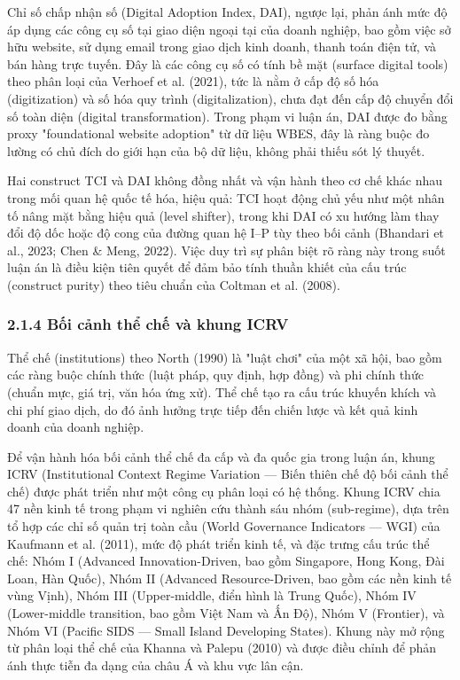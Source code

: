 \documentclass[12pt,a4paper]{article}
\begin{document}
Chỉ số chấp nhận số (Digital Adoption Index, DAI), ngược lại, phản ánh
mức độ áp dụng các công cụ số tại giao diện ngoại tại của doanh nghiệp,
bao gồm việc sở hữu website, sử dụng email trong giao dịch kinh doanh,
thanh toán điện tử, và bán hàng trực tuyến. Đây là các công cụ số có
tính bề mặt (surface digital tools) theo phân loại của Verhoef et al.
(2021), tức là nằm ở cấp độ số hóa (digitization) và số hóa quy trình
(digitalization), chưa đạt đến cấp độ chuyển đổi số toàn diện (digital
transformation). Trong phạm vi luận án, DAI được đo bằng proxy
"foundational website adoption" từ dữ liệu WBES, đây là ràng buộc đo
lường có chủ đích do giới hạn của bộ dữ liệu, không phải thiếu sót lý
thuyết.

Hai construct TCI và DAI không đồng nhất và vận hành theo cơ chế khác
nhau trong mối quan hệ quốc tế hóa, hiệu quả: TCI hoạt động chủ yếu như
một nhân tố nâng mặt bằng hiệu quả (level shifter), trong khi DAI có xu
hướng làm thay đổi độ dốc hoặc độ cong của đường quan hệ I--P tùy theo
bối cảnh (Bhandari et al., 2023; Chen \& Meng, 2022). Việc duy trì sự
phân biệt rõ ràng này trong suốt luận án là điều kiện tiên quyết để đảm
bảo tính thuần khiết của cấu trúc (construct purity) theo tiêu chuẩn của
Coltman et al. (2008).

\hypertarget{214-bux1ed1i-cux1ea3nh-thux1ec3-chux1ebf-vuxe0-khung-icrv}{%
\subsubsection{2.1.4 Bối cảnh thể chế và khung
ICRV}\label{214-bux1ed1i-cux1ea3nh-thux1ec3-chux1ebf-vuxe0-khung-icrv}}

Thể chế (institutions) theo North (1990) là "luật chơi" của một xã hội,
bao gồm các ràng buộc chính thức (luật pháp, quy định, hợp đồng) và phi
chính thức (chuẩn mực, giá trị, văn hóa ứng xử). Thể chế tạo ra cấu trúc
khuyến khích và chi phí giao dịch, do đó ảnh hưởng trực tiếp đến chiến
lược và kết quả kinh doanh của doanh nghiệp.

Để vận hành hóa bối cảnh thể chế đa cấp và đa quốc gia trong luận án,
khung ICRV (Institutional Context Regime Variation --- Biến thiên chế độ
bối cảnh thể chế) được phát triển như một công cụ phân loại có hệ thống.
Khung ICRV chia 47 nền kinh tế trong phạm vi nghiên cứu thành sáu nhóm
(sub-regime), dựa trên tổ hợp các chỉ số quản trị toàn cầu (World
Governance Indicators --- WGI) của Kaufmann et al. (2011), mức độ phát
triển kinh tế, và đặc trưng cấu trúc thể chế: Nhóm I (Advanced
Innovation-Driven, bao gồm Singapore, Hong Kong, Đài Loan, Hàn Quốc),
Nhóm II (Advanced Resource-Driven, bao gồm các nền kinh tế vùng Vịnh),
Nhóm III (Upper-middle, điển hình là Trung Quốc), Nhóm IV (Lower-middle
transition, bao gồm Việt Nam và Ấn Độ), Nhóm V (Frontier), và Nhóm VI
(Pacific SIDS --- Small Island Developing States). Khung này mở rộng từ
phân loại thể chế của Khanna và Palepu (2010) và được điều chỉnh để phản
ánh thực tiễn đa dạng của châu Á và khu vực lân cận.
\end{document}
